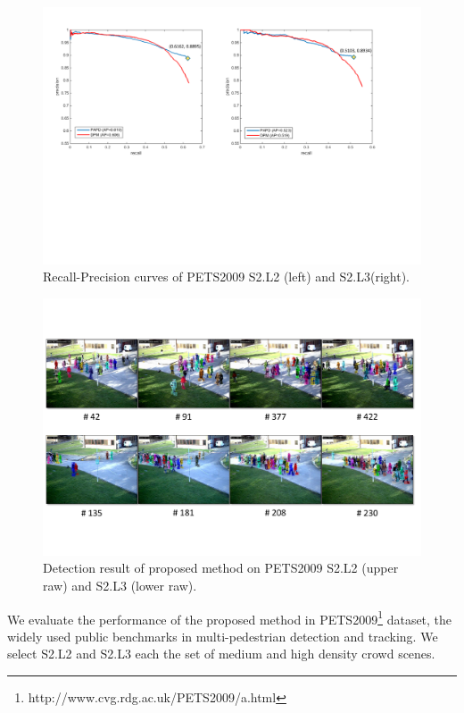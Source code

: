 \documentclass[runningheads]{llncs}
\begin{document}
\label{sec:experiments}
\begin{figure}[t]
   \includegraphics[width=1.0\textwidth]{../figures/ROC.pdf}
   \caption{Recall-Precision curves of PETS2009 S2.L2 (left) and S2.L3(right).}
   \label{fig:exp_roc}
\end{figure}
\begin{figure}
   \includegraphics[width=1.0\textwidth]{../figures/experimental_result.pdf}
   \caption{Detection result of proposed method on PETS2009 S2.L2 (upper raw) and S2.L3 (lower raw).}
   \label{fig:exp_scenes}
\end{figure}
We evaluate the performance of the proposed method in PETS2009\footnote{http://www.cvg.rdg.ac.uk/PETS2009/a.html} dataset, the widely used public benchmarks in multi-pedestrian detection and tracking.
We select S2.L2 and S2.L3 each the set of medium and high density crowd scenes.
\end{document}
